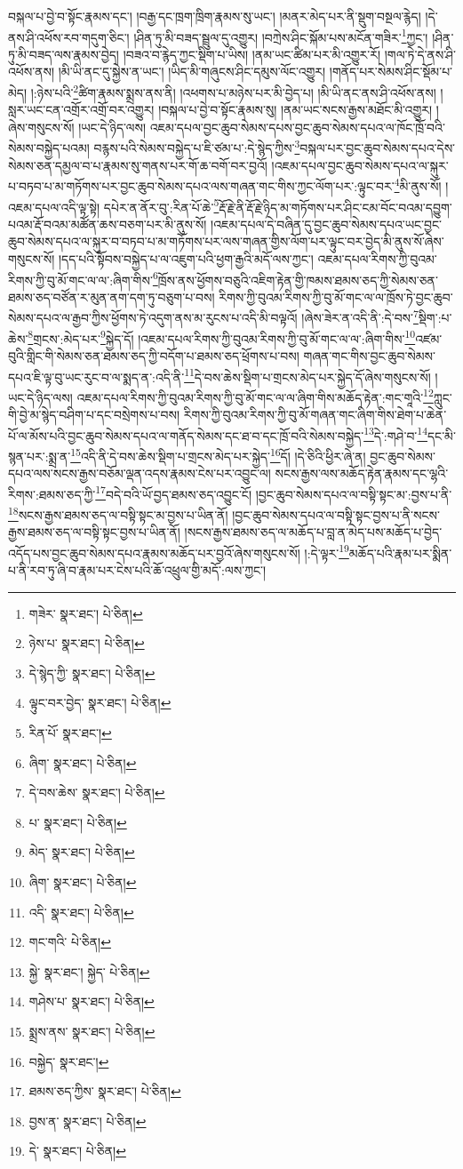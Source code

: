 བསྐལ་པ་བྱེ་བ་སྟོང་རྣམས་དང་། །བརྒྱ་དང་ཁྲག་ཁྲིག་རྣམས་སུ་ཡང་། །མནར་མེད་པར་ནི་སྡུག་བསྔལ་རྙེད། །དེ་ནས་ཤི་འཕོས་རབ་གདུག་ཅིང་། །ཤིན་ཏུ་མི་བཟད་སྦྲུལ་དུ་འགྱུར། །བཀྲེས་ཤིང་སྐོམ་པས་མངོན་གཟིར་\footnote{གཟེར་  སྣར་ཐང་།  པེ་ཅིན། }ཀྱང་། །ཤིན་ཏུ་མི་བཟད་ལས་རྣམས་བྱེད། །བཟའ་བ་རྙེད་ཀྱང་སྡིག་པ་ཡིས། །ནམ་ཡང་ཚིམ་པར་མི་འགྱུར་རོ། །གལ་ཏེ་དེ་ནས་ཤི་འཕོས་ནས། །མི་ཡི་ནང་དུ་སྐྱེས་ན་ཡང་། །ཡིད་མི་གཞུངས་ཤིང་དམུས་ལོང་འགྱུར། །གནོད་པར་སེམས་ཤིང་སྡོམ་པ་མེད། །:ཉེས་པའི་\footnote{ཉེས་པ་  སྣར་ཐང་།  པེ་ཅིན། }ཚིག་རྣམས་སྨྲས་ནས་ནི། །འཕགས་པ་མཉེས་པར་མི་བྱེད་པ། །མི་ཡི་ནང་ནས་ཤི་འཕོས་ནས། །སླར་ཡང་ངན་འགྲོར་འགྲོ་བར་འགྱུར། །བསྐལ་པ་བྱེ་བ་སྟོང་རྣམས་སུ། །ནམ་ཡང་སངས་རྒྱས་མཐོང་མི་འགྱུར། །ཞེས་གསུངས་སོ། །ཡང་དེ་ཉིད་ལས། འཇམ་དཔལ་བྱང་ཆུབ་སེམས་དཔས་བྱང་ཆུབ་སེམས་དཔའ་ལ་ཁོང་ཁྲོ་བའི་སེམས་བསྐྱེད་པའམ། བརྙས་པའི་སེམས་བསྐྱེད་པ་ཇི་ཙམ་པ་:དེ་སྙེད་ཀྱིས་\footnote{དེ་སྙེད་ཀྱི་  སྣར་ཐང་།  པེ་ཅིན། }བསྐལ་པར་བྱང་ཆུབ་སེམས་དཔའ་དེས་སེམས་ཅན་དམྱལ་བ་པ་རྣམས་སུ་གནས་པར་གོ་ཆ་བགོ་བར་བྱའོ། །འཇམ་དཔལ་བྱང་ཆུབ་སེམས་དཔའ་ལ་སྐུར་པ་བཏབ་པ་མ་གཏོགས་པར་བྱང་ཆུབ་སེམས་དཔའ་ལས་གཞན་གང་གིས་ཀྱང་ལོག་པར་:ལྟུང་བར་\footnote{ལྟུང་བར་བྱེད་  སྣར་ཐང་།  པེ་ཅིན། }མི་ནུས་སོ། །འཇམ་དཔལ་འདི་ལྟ་སྟེ། དཔེར་ན་ནོར་བུ་:རིན་པོ་ཆེ་\footnote{རིན་པོ་  སྣར་ཐང་། }རྡོ་རྗེ་ནི་རྡོ་རྗེ་ཉིད་མ་གཏོགས་པར་ཤིང་ངམ་བོང་བའམ་དབྱུག་པའམ་རྡོ་བའམ་མཚོན་ཆས་བཅག་པར་མི་ནུས་སོ། །འཇམ་དཔལ་དེ་བཞིན་དུ་བྱང་ཆུབ་སེམས་དཔའ་ཡང་བྱང་ཆུབ་སེམས་དཔའ་ལ་སྐུར་བ་བཏབ་པ་མ་གཏོགས་པར་ལས་གཞན་གྱིས་ལོག་པར་ལྟུང་བར་བྱེད་མི་ནུས་སོ་ཞེས་གསུངས་སོ། །དད་པའི་སྟོབས་བསྐྱེད་པ་ལ་འཇུག་པའི་ཕྱག་རྒྱའི་མདོ་ལས་ཀྱང་། འཇམ་དཔལ་རིགས་ཀྱི་བུའམ་རིགས་ཀྱི་བུ་མོ་གང་ལ་ལ་:ཞིག་གིས་\footnote{ཞིག་  སྣར་ཐང་།  པེ་ཅིན། }ཁྲོས་ནས་ཕྱོགས་བཅུའི་འཇིག་རྟེན་གྱི་ཁམས་ཐམས་ཅད་ཀྱི་སེམས་ཅན་ཐམས་ཅད་བཙོན་ར་མུན་ནག་དག་ཏུ་བཅུག་པ་བས། རིགས་ཀྱི་བུའམ་རིགས་ཀྱི་བུ་མོ་གང་ལ་ལ་ཁྲོས་ཏེ་བྱང་ཆུབ་སེམས་དཔའ་ལ་རྒྱབ་ཀྱིས་ཕྱོགས་ཏེ་འདུག་ནས་མ་རུངས་པ་འདི་མི་བལྟའོ། །ཞེས་ཟེར་ན་འདི་ནི་:དེ་བས་\footnote{དེ་བས་ཆེས་  སྣར་ཐང་།  པེ་ཅིན། }སྡིག་:པ་ཆེས་\footnote{པ་  སྣར་ཐང་།  པེ་ཅིན། }གྲངས་:མེད་པར་\footnote{མེད་  སྣར་ཐང་།  པེ་ཅིན། }སྐྱེད་དོ། །འཇམ་དཔལ་རིགས་ཀྱི་བུའམ་རིགས་ཀྱི་བུ་མོ་གང་ལ་ལ་:ཞིག་གིས་\footnote{ཞིག་  སྣར་ཐང་།  པེ་ཅིན། }འཛམ་བུའི་གླིང་གི་སེམས་ཅན་ཐམས་ཅད་ཀྱི་བདོག་པ་ཐམས་ཅད་ཕྲོགས་པ་བས། གཞན་གང་གིས་བྱང་ཆུབ་སེམས་དཔའ་ཇི་ལྟ་བུ་ཡང་རུང་བ་ལ་སྨད་ན་:འདི་ནི་\footnote{འདི་  སྣར་ཐང་།  པེ་ཅིན། }དེ་བས་ཆེས་སྡིག་པ་གྲངས་མེད་པར་སྐྱེད་དོ་ཞེས་གསུངས་སོ། །ཡང་དེ་ཉིད་ལས། འཇམ་དཔལ་རིགས་ཀྱི་བུའམ་རིགས་ཀྱི་བུ་མོ་གང་ལ་ལ་ཞིག་གིས་མཆོད་རྟེན་:གང་གཱའི་\footnote{གང་གའི་  པེ་ཅིན། }ཀླུང་གི་བྱེ་མ་སྙེད་བཤིག་པ་དང་བསྲེགས་པ་བས། རིགས་ཀྱི་བུའམ་རིགས་ཀྱི་བུ་མོ་གཞན་གང་ཞིག་གིས་ཐེག་པ་ཆེན་པོ་ལ་མོས་པའི་བྱང་ཆུབ་སེམས་དཔའ་ལ་གནོད་སེམས་དང་ཐ་བ་དང་ཁྲོ་བའི་སེམས་བསྐྱེད་\footnote{སྐྱེ་  སྣར་ཐང་། སྐྱེད་  པེ་ཅིན། }དེ་:གཤེ་བ་\footnote{གཤེས་པ་  སྣར་ཐང་།  པེ་ཅིན། }དང་མི་སྙན་པར་:སྨྲ་ན་\footnote{སྨྲས་ནས་  སྣར་ཐང་།  པེ་ཅིན། }འདི་ནི་དེ་བས་ཆེས་སྡིག་པ་གྲངས་མེད་པར་སྐྱེད་\footnote{བསྐྱེད་  སྣར་ཐང་། }དོ། །དེ་ཅིའི་ཕྱིར་ཞེ་ན། བྱང་ཆུབ་སེམས་དཔའ་ལས་སངས་རྒྱས་བཅོམ་ལྡན་འདས་རྣམས་ངེས་པར་འབྱུང་ལ། སངས་རྒྱས་ལས་མཆོད་རྟེན་རྣམས་དང་ལྷའི་རིགས་:ཐམས་ཅད་ཀྱི་\footnote{ཐམས་ཅད་ཀྱིས་  སྣར་ཐང་།  པེ་ཅིན། }བདེ་བའི་ཡོ་བྱད་ཐམས་ཅད་འབྱུང་ངོ། །བྱང་ཆུབ་སེམས་དཔའ་ལ་བསྟི་སྟང་མ་:བྱས་པ་ནི་\footnote{བྱས་ན་  སྣར་ཐང་།  པེ་ཅིན། }སངས་རྒྱས་ཐམས་ཅད་ལ་བསྟི་སྟང་མ་བྱས་པ་ཡིན་ནོ། །བྱང་ཆུབ་སེམས་དཔའ་ལ་བསྟི་སྟང་བྱས་པ་ནི་སངས་རྒྱས་ཐམས་ཅད་ལ་བསྟི་སྟང་བྱས་པ་ཡིན་ནོ། །སངས་རྒྱས་ཐམས་ཅད་ལ་མཆོད་པ་བླ་ན་མེད་པས་མཆོད་པ་བྱེད་འདོད་པས་བྱང་ཆུབ་སེམས་དཔའ་རྣམས་མཆོད་པར་བྱའོ་ཞེས་གསུངས་སོ། །:དེ་ལྟར་\footnote{དེ་  སྣར་ཐང་།  པེ་ཅིན། }མཆོད་པའི་རྣམ་པར་སྨིན་པ་ནི་རབ་ཏུ་ཞི་བ་རྣམ་པར་ངེས་པའི་ཆོ་འཕྲུལ་གྱི་མདོ་:ལས་ཀྱང་། 